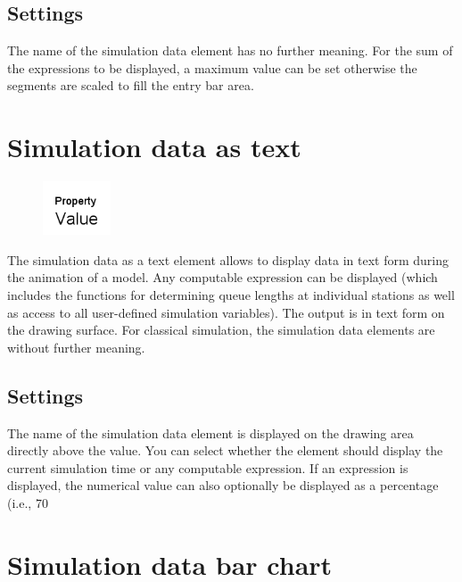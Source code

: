 \subsection*{Settings}

The name of the simulation data element has no further meaning.
For the sum of the expressions to be displayed, a maximum value can be set 
otherwise the segments are scaled to fill the entry bar area.


\section{Simulation data as text}
\label{ref:ModelElementAnimationText}

\begin{figure}
\vspace{-22pt}
\includegraphics[width=2cm]{imageModelElementAnimationText.png}
\vspace{-22pt}
\end{figure}

The simulation data as a text element allows to display data in text form during the animation of a model.
Any computable expression can be displayed (which includes the functions for determining queue lengths at
individual stations as well as access to all user-defined simulation variables). The output is in text form
on the drawing surface. For classical simulation, the simulation data elements are without further meaning.

\subsection*{Settings}

The name of the simulation data element is displayed on the drawing area directly above the value.
You can select whether the element should display the current simulation time or any computable expression.
If an expression is displayed, the numerical value can also optionally be displayed as a percentage
(i.e., 70%


\section{Simulation data bar chart}
\label{ref:ModelElementAnimationBarChart}

